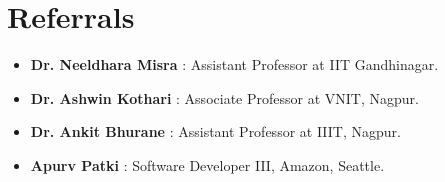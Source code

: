 \documentclass[a4paper,10pt]{extarticle} %
\begin{document}
\section{\textcolor{primary}{Referrals}}
\begin{itemize}[leftmargin=0.55cm, rightmargin=0.2cm, label={\Large\textbullet}]
\vspace{0.2cm}
\item \textbf{Dr. Neeldhara Misra} : Assistant Professor at IIT Gandhinagar.
\vspace{-0.15cm}
\item \textbf{Dr. Ashwin Kothari} : Associate Professor at VNIT, Nagpur.
\vspace{-0.15cm}
\item \textbf{Dr. Ankit Bhurane} : Assistant Professor at IIIT, Nagpur.
\vspace{-0.15cm}
\item \textbf{Apurv Patki} : Software Developer III, Amazon, Seattle.
\end{itemize}







\end{document}

